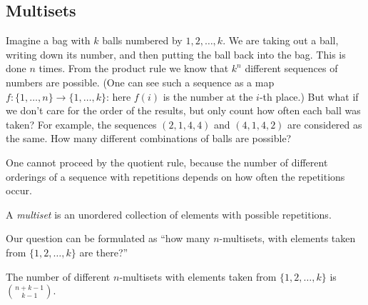 \begin{page}
\setcounter{section}{3}
\setcounter{subsection}{6}
\setcounter{dfn}{13}
\label{portion:122}

\subsection{Multisets}
Imagine a bag with $k$ balls numbered by $1, 2, \ldots, k$.
We are taking out a ball, writing down its number, and then putting the ball back into the bag.
This is done $n$ times.
From the product rule we know that $k^n$ different sequences of numbers are possible.
(One can see such a sequence as a map $f \colon \{1, \ldots, n\} \to \{1, \ldots, k\}$: here $f(i)$ is the number at the $i$-th place.)
But what if we don't care for the order of the results, but only count how often each ball was taken?
For example, the sequences $(2, 1, 4, 4)$ and $(4, 1, 4, 2)$ are considered as the same.
How many different combinations of balls are possible?

One cannot proceed by the quotient rule, because the number of different orderings of a sequence with repetitions depends on how often the repetitions occur.


\end{page}

\begin{page}
\setcounter{section}{3}
\setcounter{subsection}{6}
\setcounter{dfn}{14}
\label{portion:124}

\begin{dfn}
A \emph{multiset} is an unordered collection of elements with possible repetitions.
\end{dfn}

\end{page}

\begin{page}
\setcounter{section}{3}
\setcounter{subsection}{6}
\setcounter{dfn}{14}
\label{portion:125}

Our question can be formulated as ``how many $n$-multisets, with elements taken from $\{1, 2, \ldots, k\}$ are there?''


\end{page}

\begin{page}
\setcounter{section}{3}
\setcounter{subsection}{6}
\setcounter{dfn}{15}
\label{portion:127}

\begin{thm}
The number of different $n$-multisets with elements taken from $\{1, 2, \ldots, k\}$ is $\binom{n+k-1}{k-1}$.
\end{thm}

\end{page}

